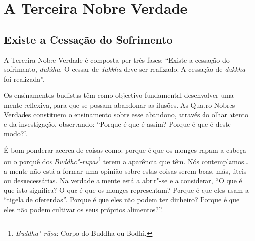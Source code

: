 
\chapter{A Terceira Nobre Verdade}

\pagestyle{topbottomcorner}

\section{Existe a Cessação do Sofrimento}

A Terceira Nobre Verdade é composta por três fases: “Existe a cessação do
sofrimento, \emph{dukkha}. O cessar de \emph{dukkha} deve ser realizado. A
cessação de \emph{dukkha} foi realizada”.

Os ensinamentos budistas têm como objectivo fundamental desenvolver uma mente
reflexiva, para que se possam abandonar as ilusões. As Quatro Nobres Verdades
constituem o ensinamento sobre esse abandono, através do olhar atento e da
investigação, observando: “Porque é que é assim? Porque é que é deste modo?”.

É bom ponderar acerca de coisas como: porque é que os monges rapam a cabeça ou o
porquê dos \emph{Buddha"-rūpas}\footnote{%
  \emph{Buddha"-rūpa}: Corpo do Buddha ou Bodhi.} terem a aparência que têm. Nós
contemplamos\ldots{} a mente não está a formar uma opinião sobre estas coisas
serem boas, más, úteis ou desnecessárias. Na verdade a mente está a abrir"-se e a
considerar, “O que é que isto significa? O que é que os monges representam?
Porque é que eles usam a “tigela de oferendas”. Porque é que eles não podem ter
dinheiro? Porque é que eles não podem cultivar os seus próprios alimentos?”.

